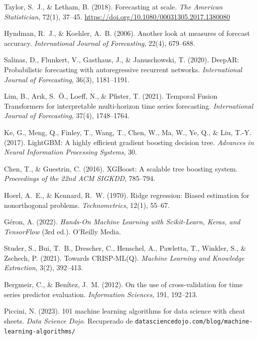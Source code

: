 \documentclass[12pt, letterpaper]{article}
\begin{document}
\begin{enumerate}[label={[\arabic*]}, leftmargin=*, noitemsep]
    \item Taylor, S.~J., \& Letham, B. (2018). Forecasting at scale. \textit{The American Statistician}, 72(1), 37--45. \url{https://doi.org/10.1080/00031305.2017.1380080}

    \item Hyndman, R.~J., \& Koehler, A.~B. (2006). Another look at measures of forecast accuracy. \textit{International Journal of Forecasting}, 22(4), 679--688.

    \item Salinas, D., Flunkert, V., Gasthaus, J., \& Januschowski, T. (2020). DeepAR: Probabilistic forecasting with autoregressive recurrent networks. \textit{International Journal of Forecasting}, 36(3), 1181--1191.

    \item Lim, B., Arık, S.~Ö., Loeff, N., \& Pfister, T. (2021). Temporal Fusion Transformers for interpretable multi-horizon time series forecasting. \textit{International Journal of Forecasting}, 37(4), 1748--1764.

    \item Ke, G., Meng, Q., Finley, T., Wang, T., Chen, W., Ma, W., Ye, Q., \& Liu, T.-Y. (2017). LightGBM: A highly efficient gradient boosting decision tree. \textit{Advances in Neural Information Processing Systems}, 30.

    \item Chen, T., \& Guestrin, C. (2016). XGBoost: A scalable tree boosting system. \textit{Proceedings of the 22nd ACM SIGKDD}, 785--794.

    \item Hoerl, A.~E., \& Kennard, R.~W. (1970). Ridge regression: Biased estimation for nonorthogonal problems. \textit{Technometrics}, 12(1), 55--67.

    \item Géron, A. (2022). \textit{Hands-On Machine Learning with Scikit-Learn, Keras, and TensorFlow} (3rd ed.). O'Reilly Media.

    \item Studer, S., Bui, T.~B., Drescher, C., Henschel, A., Pawletta, T., Winkler, S., \& Zschech, P. (2021). Towards CRISP-ML(Q). \textit{Machine Learning and Knowledge Extraction}, 3(2), 392--413.

    \item Bergmeir, C., \& Benítez, J.~M. (2012). On the use of cross-validation for time series predictor evaluation. \textit{Information Sciences}, 191, 192--213.

    \item Piccini, N. (2023). 101 machine learning algorithms for data science with cheat sheets. \textit{Data Science Dojo}. Recuperado de \nolinkurl{datasciencedojo.com/blog/machine-learning-algorithms/}
\end{enumerate}
\end{document}
